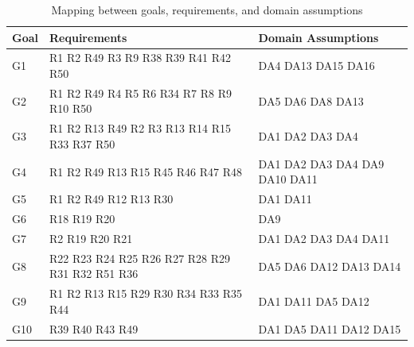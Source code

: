 \begin{table}[H]
  \begin{tabular}{|l|l|p{5cm}| }
    \hline
    \textbf{Goal} & \textbf{Requirements} & \textbf{Domain Assumptions}      \\
    \hline
    G1 & R1 R2 R49 R3 R9 R38 R39 R41 R42 R50 & DA4 DA13 DA15 DA16 \\
    \hline
    G2 & R1 R2 R49 R4 R5 R6 R34 R7 R8 R9 R10 R50 & DA5 DA6 DA8 DA13 \\
    \hline
    G3 & R1 R2 R13 R49 R2 R3 R13 R14 R15 R33 R37 R50 & DA1 DA2 DA3 DA4 \\
    \hline
    G4 & R1 R2 R49 R13 R15 R45 R46 R47 R48 & DA1 DA2 DA3 DA4 DA9 DA10 DA11  \\
    \hline
    G5 & R1 R2 R49 R12 R13 R30 & DA1 DA11  \\
    \hline
    G6 & R18 R19 R20 & DA9 \\
    \hline
    G7 & R2 R19 R20 R21 & DA1 DA2 DA3 DA4 DA11 \\
    \hline
    G8 & R22 R23 R24 R25 R26 R27 R28 R29 R31 R32 R51 R36 & DA5 DA6 DA12 DA13 DA14 \\
    \hline
    G9 & R1 R2 R13 R15 R29 R30 R34 R33 R35 R44 & DA1 DA11 DA5 DA12
    \\
    \hline
    G10 & R39 R40 R43 R49 & DA1 DA5 DA11 DA12 DA15   \\
    \hline
  \end{tabular}
  \caption{Mapping between goals, requirements, and domain assumptions}
  \label{tab:mapping}
\end{table}

